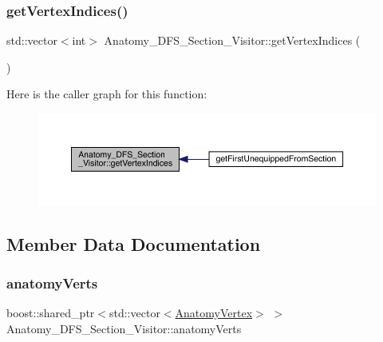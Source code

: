 \mbox{\label{class_anatomy___d_f_s___section___visitor_a9b7e0b16571acd04cde2b61b5094cb42}} 
\subsubsection{\texorpdfstring{get\+Vertex\+Indices()}{getVertexIndices()}}
{\footnotesize\ttfamily std\+::vector$<$int$>$ Anatomy\+\_\+\+D\+F\+S\+\_\+\+Section\+\_\+\+Visitor\+::get\+Vertex\+Indices (\begin{DoxyParamCaption}{ }\end{DoxyParamCaption})\hspace{0.3cm}{\ttfamily [inline]}}

Here is the caller graph for this function\+:
\nopagebreak
\begin{figure}[H]
\begin{center}
\leavevmode
\includegraphics[width=350pt]{class_anatomy___d_f_s___section___visitor_a9b7e0b16571acd04cde2b61b5094cb42_icgraph}
\end{center}
\end{figure}


\subsection{Member Data Documentation}
\mbox{\label{class_anatomy___d_f_s___section___visitor_a8cfa2b3f70b1a3b54252d990d84e7842}} 
\subsubsection{\texorpdfstring{anatomy\+Verts}{anatomyVerts}}
{\footnotesize\ttfamily boost\+::shared\+\_\+ptr$<$std\+::vector$<$\mbox{\hyperlink{_body_graph_8hpp_aeb92fc7b3eed88cf25a4fc7b708a66cf}{Anatomy\+Vertex}}$>$ $>$ Anatomy\+\_\+\+D\+F\+S\+\_\+\+Section\+\_\+\+Visitor\+::anatomy\+Verts\hspace{0.3cm}{\ttfamily [private]}}

